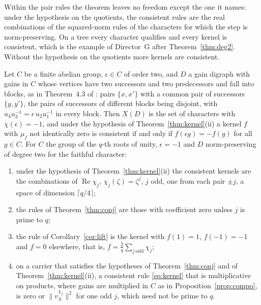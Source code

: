 Within the pair rules the theorem leaves no freedom except the one it names: under the hypothesis on the quotients, the consistent rules are the real combinations of the squared-norm rules of the characters for which the step is norm-preserving. On a tree every character qualifies and every kernel is consistent, which is the example of Director~G after Theorem~\ref{thm:deg2}. Without the hypothesis on the quotients more kernels are consistent.

\begin{corollary}\label{cor:kernel2}
Let $C$ be a finite abelian group, $\epsilon\in C$ of order two, and $D$ a gain digraph with gains in $C$ whose vertices have two successors and two predecessors and fall into blocks, as in Theorem~4.3 of \cite{g9}: pairs $\{x,x'\}$ with a common pair of successors $\{y,y'\}$, the pairs of successors of different blocks being disjoint, with $u_4u_3^{-1}=\epsilon\,u_2u_1^{-1}$ in every block. Then $X(D)$ is the set of characters with $\chi(\epsilon)=-1$, and under the hypothesis of Theorem~\ref{thm:kernel}(ii) a kernel $f$ with $\mu_f$ not identically zero is consistent if and only if $f(\epsilon g)=-f(g)$ for all $g\in C$. For $C$ the group of the $q$-th roots of unity, $\epsilon=-1$ and $D$ norm-preserving of degree two for the faithful character:
\begin{enumerate}[label=(\alph*)]
\item under the hypothesis of Theorem~\ref{thm:kernel}(ii) the consistent kernels are the combinations of $\operatorname{Re}\chi_j$, $\chi_j(\zeta)=\zeta^j$, $j$ odd, one from each pair $\pm j$, a space of dimension $\lceil q/4\rceil$;
\item the rules of Theorem~\ref{thm:conj} are those with coefficient zero unless $j$ is prime to $q$;
\item the rule of Corollary~\ref{cor:lift} is the kernel with $f(1)=1$, $f(-1)=-1$ and $f=0$ elsewhere, that is, $f=\frac2q\sum_{j\ \mathrm{odd}}\chi_j$;
\item on a carrier that satisfies the hypotheses of Theorem~\ref{thm:conj} and of Theorem~\ref{thm:kernel}(ii), a consistent rule \eqref{eq:kernel} that is multiplicative on products, where gains are multiplied in $C$ as in Proposition~\ref{prop:compo}, is zero or $\lVert v^{\chi_j}_S\rVert^2$ for one odd $j$, which need not be prime to $q$.
\end{enumerate}
\end{corollary}
